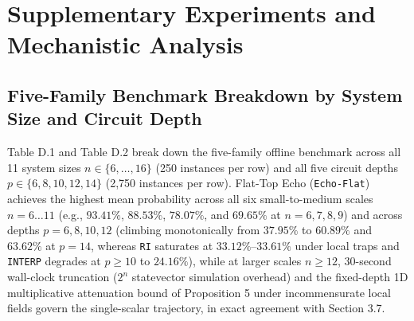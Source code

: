 \documentclass{article}
\theoremstyle{plain}
\theoremstyle{definition}
\begin{document}
\section{Supplementary Experiments and Mechanistic Analysis}\label{app:D}

\subsection{Five-Family Benchmark Breakdown by System Size and Circuit Depth}\label{subsec:d_1}

Table D.1 and Table D.2 break down the five-family offline benchmark across all 11 system sizes $n\in\{6,\ldots,16\}$ (250 instances per row) and all five circuit depths $p\in\{6,8,10,12,14\}$ (2,750 instances per row). Flat-Top Echo (\texttt{Echo-Flat}) achieves the highest mean probability across all six small-to-medium scales $n=6\ldots 11$ (e.g., $\mathbf{93.41}\%$, $\mathbf{88.53}\%$, $\mathbf{78.07}\%$, and $\mathbf{69.65}\%$ at $n=6,7,8,9$) and across depths $p=6,8,10,12$ (climbing monotonically from $\mathbf{37.95}\%$ to $\mathbf{60.89}\%$ and $63.62\%$ at $p=14$, whereas \texttt{RI} saturates at $33.12\%\text{--}33.61\%$ under local traps and \texttt{INTERP} degrades at $p\ge 10$ to $24.16\%$), while at larger scales $n\ge 12$, 30-second wall-clock truncation ($2^n$ statevector simulation overhead) and the fixed-depth 1D multiplicative attenuation bound of Proposition 5 under incommensurate local fields govern the single-scalar trajectory, in exact agreement with Section 3.7.
\end{document}
